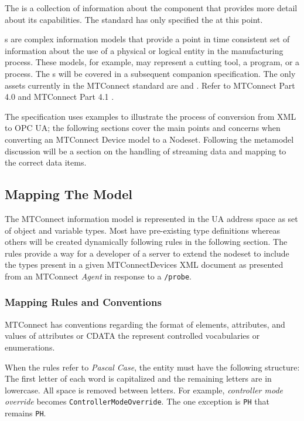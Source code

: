 The  is a collection of information about the component that provides more detail about its capabilities. The standard has only specified the  at this point.

s are complex information models that provide a point in time consistent set of information about the use of a physical or logical entity in the manufacturing process. These models, for example, may represent a cutting tool, a program, or a process. The s will be covered in a subsequent companion specification. The only assets currently in the MTConnect standard are  and . Refer to MTConnect Part 4.0 \cite{MTCPart40} and MTConnect Part 4.1 \cite{MTCPart41}.

The specification uses examples to illustrate the process of conversion from XML to OPC UA; the following sections cover the main points and concerns when converting an MTConnect Device model to a Nodeset. Following the metamodel discussion will be a section on the handling of streaming data and mapping to the correct data items. 

\subsection{Mapping The Model}
\lstset{language=XML,numbers=left,xleftmargin=2em}

The MTConnect information model is represented in the UA address space as set of object and variable types. Most have pre-existing type definitions whereas others will be created dynamically following rules in the following section. The rules provide a way for a developer of a server to extend the nodeset to include the types present in a given MTConnectDevices XML document as presented from an MTConnect \textit{Agent} in response to a \texttt{/probe}.

\subsubsection{Mapping Rules and Conventions}\label{sec:mapping-rules}

MTConnect has conventions regarding the format of elements, attributes, and values of attributes or CDATA the represent controlled vocabularies or enumerations. 

When the rules refer to \textit{Pascal Case}, the entity must have the following structure: The first letter of each word is capitalized and the remaining letters are in lowercase. All space is removed between letters. For example, \textit{controller mode override} becomes \texttt{Controller\-Mode\-Override}. The one exception is \texttt{PH} that remains \texttt{PH}.

